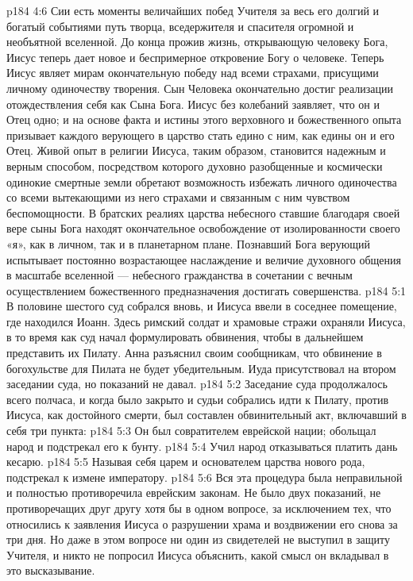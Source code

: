 \vs p184 4:6 Сии есть моменты величайших побед Учителя за весь его долгий и богатый событиями путь творца, вседержителя и спасителя огромной и необъятной вселенной. До конца прожив жизнь, открывающую человеку Бога, Иисус теперь дает новое и беспримерное откровение Богу о человеке. Теперь Иисус являет мирам окончательную победу над всеми страхами, присущими личному одиночеству творения. Сын Человека окончательно достиг реализации отождествления себя как Сына Бога. Иисус без колебаний заявляет, что он и Отец одно; и на основе факта и истины этого верховного и божественного опыта призывает каждого верующего в царство стать едино с ним, как едины он и его Отец. Живой опыт в религии Иисуса, таким образом, становится надежным и верным способом, посредством которого духовно разобщенные и космически одинокие смертные земли обретают возможность избежать личного одиночества со всеми вытекающими из него страхами и связанным с ним чувством беспомощности. В братских реалиях царства небесного ставшие благодаря своей вере сыны Бога находят окончательное освобождение от изолированности своего «я», как в личном, так и в планетарном плане. Познавший Бога верующий испытывает постоянно возрастающее наслаждение и величие духовного общения в масштабе вселенной --- небесного гражданства в сочетании с вечным осуществлением божественного предназначения достигать совершенства.
\vs p184 5:1 В половине шестого суд собрался вновь, и Иисуса ввели в соседнее помещение, где находился Иоанн. Здесь римский солдат и храмовые стражи охраняли Иисуса, в то время как суд начал формулировать обвинения, чтобы в дальнейшем представить их Пилату. Анна разъяснил своим сообщникам, что обвинение в богохульстве для Пилата не будет убедительным. Иуда присутствовал на втором заседании суда, но показаний не давал.
\vs p184 5:2 Заседание суда продолжалось всего полчаса, и когда было закрыто и судьи собрались идти к Пилату, против Иисуса, как достойного смерти, был составлен обвинительный акт, включавший в себя три пункта:
\vs p184 5:3 \bibnobreakspace Он был совратителем еврейской нации; обольщал народ и подстрекал его к бунту.
\vs p184 5:4 \bibnobreakspace Учил народ отказываться платить дань кесарю.
\vs p184 5:5 \bibnobreakspace Называя себя царем и основателем царства нового рода, подстрекал к измене императору.
\vs p184 5:6 \pc Вся эта процедура была неправильной и полностью противоречила еврейским законам. Не было двух показаний, не противоречащих друг другу хотя бы в одном вопросе, за исключением тех, что относились к заявления Иисуса о разрушении храма и воздвижении его снова за три дня. Но даже в этом вопросе ни один из свидетелей не выступил в защиту Учителя, и никто не попросил Иисуса объяснить, какой смысл он вкладывал в это высказывание.
